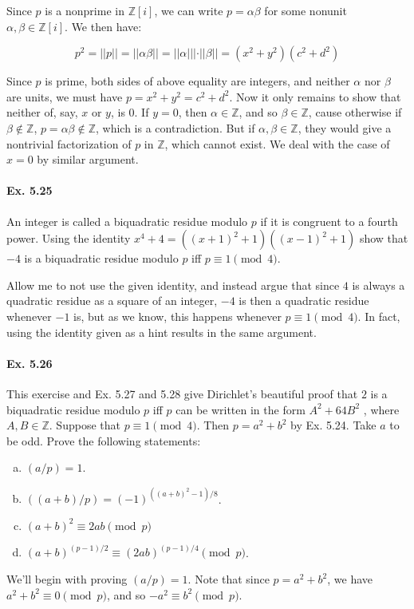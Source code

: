 \documentclass[notitlepage]{article}
\theoremstyle{definition}
\newcommand\Z{\mathbb{Z}}
\begin{document}
Since $p$ is a nonprime in $\Z[i]$, we can write $p = \alpha \beta$
for some nonunit $\alpha, \beta \in \Z[i]$. We then have:

\begin{equation}
  p^2 = ||p|| = ||\alpha \beta|| = ||\alpha|||\cdot||\beta|| = (x^2 + y^2)(c^2 + d^2)
\end{equation}

Since $p$ is prime, both sides of above equality are integers, and
neither $\alpha$ nor $\beta$ are units, we must have $p = x^2 + y^2 =
c^2 + d^2$. Now it only remains to show that neither of, say, $x$ or
$y$, is $0$. If $y = 0$, then $\alpha \in \Z$, and so $\beta \in \Z$,
cause otherwise if $\beta \not \in \Z$, $p = \alpha \beta \not \in
\Z$, which is a contradiction. But if $\alpha, \beta \in \Z$, they
would give a nontrivial factorization of $p$ in $\Z$, which cannot
exist. We deal with the case of $x = 0$ by similar argument.

\paragraph{Ex. 5.25}
An integer is called a biquadratic residue modulo $p$ if it is
congruent to a fourth power. Using the identity $x^4 + 4 = ((x + 1)^2
+ 1)((x - 1)^2 + 1)$ show that $-4$ is a biquadratic residue modulo $p$
iff $p \equiv 1 \pmod 4$.

Allow me to not use the given identity, and instead argue that since
$4$ is always a quadratic residue as a square of an integer, $-4$ is
then a quadratic residue whenever $-1$ is, but as we know, this
happens whenever $p \equiv 1 \pmod 4$. In fact, using the identity
given as a hint results in the same argument.

\paragraph{Ex. 5.26}
This exercise and Ex. 5.27 and 5.28 give Dirichlet's beautiful proof
that $2$ is a biquadratic residue modulo $p$ iff $p$ can be written in
the form $A^2 + 64B^2$ , where $A, B \in \Z$. Suppose that $p \equiv 1
\pmod 4$. Then $p = a^2 + b^2$ by Ex. 5.24. Take $a$ to be odd.  Prove
the following statements:

\begin{enumerate}[a)]
\item $(a/p) = 1$.
\item $((a + b)/p) = (-1)^{((a+b)^2 -1)/8}$.
\item $(a + b)^2 \equiv 2ab \pmod p$
\item $(a + b)^{(p- 1)/2} \equiv (2ab)^{(p- 1)/4} \pmod p$.
\end{enumerate}

We'll begin with proving $(a/p) = 1$. Note that since $p = a^2 + b^2$,
we have $a^2 + b^2 \equiv 0 \pmod p$, and so $-a^2 \equiv b^2 \pmod p$. 
\end{document}
